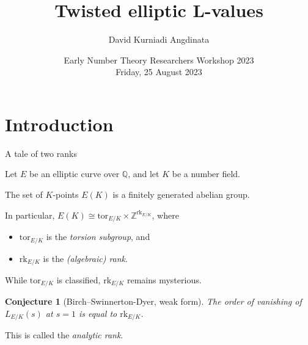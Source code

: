 \documentclass[10pt]{beamer}
\title{Twisted elliptic L-values}
\author[David Ang]{David Kurniadi Angdinata}
\institute[LSGNT]{London School of Geometry and Number Theory}
\date[ENTR23]{\small Early Number Theory Researchers Workshop 2023 \\ \vspace{0.5cm} \footnotesize Friday, 25 August 2023}
\newtheorem{conjecture}{Conjecture}
\begin{document}
\frame{\titlepage}

\section{Introduction}

\begin{frame}[t]{A tale of two ranks}

Let $ E $ be an elliptic curve over $ \mathbb{Q} $, and let $ K $ be a number field.

\pause

\vspace{0.5cm}

\begin{theorem}
The set of $ K $-points $ E(K) $ is a finitely generated abelian group.
\end{theorem}

In particular, $ E(K) \cong \mathrm{tor}_{E / K} \times \mathbb{Z}^{\mathrm{rk}_{E / K}} $, where
\begin{itemize}
\item $ \mathrm{tor}_{E / K} $ is the \emph{torsion subgroup}, and
\item $ \mathrm{rk}_{E / K} $ is the \emph{(algebraic) rank}.
\end{itemize}
While $ \mathrm{tor}_{E / K} $ is classified, $ \mathrm{rk}_{E / K} $ remains mysterious.

\pause

\vspace{0.5cm}

\begin{conjecture}[Birch--Swinnerton-Dyer, weak form]
The order of vanishing of $ L_{E / K}(s) $ at $ s = 1 $ is equal to $ \mathrm{rk}_{E / K} $.
\end{conjecture}

This is called the \emph{analytic rank}.

\end{frame}
\end{document}
